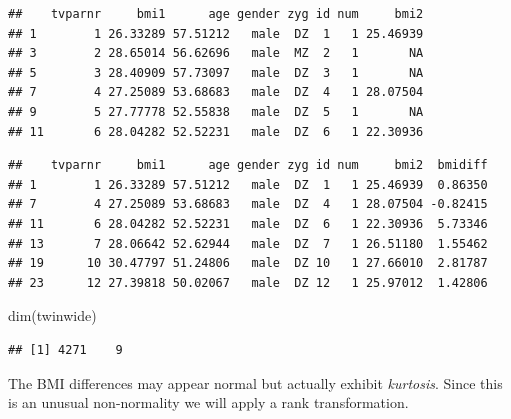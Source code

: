 \documentclass[
]{book}
\newenvironment{Shaded}{\begin{snugshade}}{\end{snugshade}}
\newcommand{\FunctionTok}[1]{\textcolor[rgb]{0.00,0.00,0.00}{#1}}
\newcommand{\NormalTok}[1]{#1}
\newcommand{\OtherTok}[1]{\textcolor[rgb]{0.56,0.35,0.01}{#1}}
\newcommand{\SpecialCharTok}[1]{\textcolor[rgb]{0.00,0.00,0.00}{#1}}
\begin{document}
\begin{verbatim}
##    tvparnr     bmi1      age gender zyg id num     bmi2
## 1        1 26.33289 57.51212   male  DZ  1   1 25.46939
## 3        2 28.65014 56.62696   male  MZ  2   1       NA
## 5        3 28.40909 57.73097   male  DZ  3   1       NA
## 7        4 27.25089 53.68683   male  DZ  4   1 28.07504
## 9        5 27.77778 52.55838   male  DZ  5   1       NA
## 11       6 28.04282 52.52231   male  DZ  6   1 22.30936
\end{verbatim}

\begin{Shaded}
\end{Shaded}

\begin{verbatim}
##    tvparnr     bmi1      age gender zyg id num     bmi2  bmidiff
## 1        1 26.33289 57.51212   male  DZ  1   1 25.46939  0.86350
## 7        4 27.25089 53.68683   male  DZ  4   1 28.07504 -0.82415
## 11       6 28.04282 52.52231   male  DZ  6   1 22.30936  5.73346
## 13       7 28.06642 52.62944   male  DZ  7   1 26.51180  1.55462
## 19      10 30.47797 51.24806   male  DZ 10   1 27.66010  2.81787
## 23      12 27.39818 50.02067   male  DZ 12   1 25.97012  1.42806
\end{verbatim}

\begin{Shaded}
\begin{Highlighting}[]
\FunctionTok{dim}\NormalTok{(twinwide)}
\end{Highlighting}
\end{Shaded}

\begin{verbatim}
## [1] 4271    9
\end{verbatim}

The BMI differences may appear normal but actually exhibit \emph{kurtosis}. Since this is an unusual non-normality we will apply a rank transformation.
\end{document}
